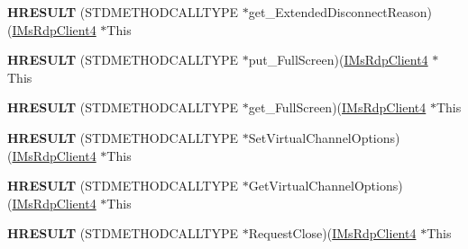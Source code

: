 \begin{DoxyCompactItemize}
\item 
\mbox{\label{struct_m_s_t_s_c_lib_1_1_i_ms_rdp_client4_vtbl_a148834046cc46daa0ef2bce68deb3983}} 
{\bfseries H\+R\+E\+S\+U\+LT} (S\+T\+D\+M\+E\+T\+H\+O\+D\+C\+A\+L\+L\+T\+Y\+PE $\ast$get\+\_\+\+Extended\+Disconnect\+Reason)(\hyperlink{interface_m_s_t_s_c_lib_1_1_i_ms_rdp_client4}{I\+Ms\+Rdp\+Client4} $\ast$This
\item 
\mbox{\label{struct_m_s_t_s_c_lib_1_1_i_ms_rdp_client4_vtbl_a8eba518056bce37444b6da8428f0d67a}} 
{\bfseries H\+R\+E\+S\+U\+LT} (S\+T\+D\+M\+E\+T\+H\+O\+D\+C\+A\+L\+L\+T\+Y\+PE $\ast$put\+\_\+\+Full\+Screen)(\hyperlink{interface_m_s_t_s_c_lib_1_1_i_ms_rdp_client4}{I\+Ms\+Rdp\+Client4} $\ast$This
\item 
\mbox{\label{struct_m_s_t_s_c_lib_1_1_i_ms_rdp_client4_vtbl_ab3af6aa55933411b877b566791e279c8}} 
{\bfseries H\+R\+E\+S\+U\+LT} (S\+T\+D\+M\+E\+T\+H\+O\+D\+C\+A\+L\+L\+T\+Y\+PE $\ast$get\+\_\+\+Full\+Screen)(\hyperlink{interface_m_s_t_s_c_lib_1_1_i_ms_rdp_client4}{I\+Ms\+Rdp\+Client4} $\ast$This
\item 
\mbox{\label{struct_m_s_t_s_c_lib_1_1_i_ms_rdp_client4_vtbl_abf45ad02fb836411dadfae9e1e396202}} 
{\bfseries H\+R\+E\+S\+U\+LT} (S\+T\+D\+M\+E\+T\+H\+O\+D\+C\+A\+L\+L\+T\+Y\+PE $\ast$Set\+Virtual\+Channel\+Options)(\hyperlink{interface_m_s_t_s_c_lib_1_1_i_ms_rdp_client4}{I\+Ms\+Rdp\+Client4} $\ast$This
\item 
\mbox{\label{struct_m_s_t_s_c_lib_1_1_i_ms_rdp_client4_vtbl_aa7b6dc7821bff6891016556853280be9}} 
{\bfseries H\+R\+E\+S\+U\+LT} (S\+T\+D\+M\+E\+T\+H\+O\+D\+C\+A\+L\+L\+T\+Y\+PE $\ast$Get\+Virtual\+Channel\+Options)(\hyperlink{interface_m_s_t_s_c_lib_1_1_i_ms_rdp_client4}{I\+Ms\+Rdp\+Client4} $\ast$This
\item 
\mbox{\label{struct_m_s_t_s_c_lib_1_1_i_ms_rdp_client4_vtbl_a753263201fb20cfe89afeb2fa0b12047}} 
{\bfseries H\+R\+E\+S\+U\+LT} (S\+T\+D\+M\+E\+T\+H\+O\+D\+C\+A\+L\+L\+T\+Y\+PE $\ast$Request\+Close)(\hyperlink{interface_m_s_t_s_c_lib_1_1_i_ms_rdp_client4}{I\+Ms\+Rdp\+Client4} $\ast$This

\end{DoxyCompactItemize}
